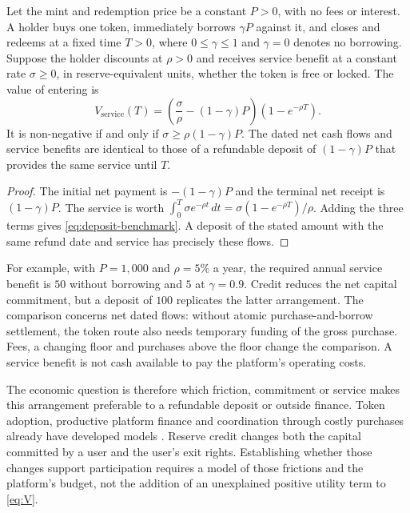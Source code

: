 \begin{samepage}
\begin{proposition}\label{prop:deposit-benchmark}
Let the mint and redemption price be a constant $P>0$, with no fees or interest. A holder buys one token, immediately borrows $\gamma P$ against it, and closes and redeems at a fixed time $T>0$, where $0\le\gamma\le1$ and $\gamma=0$ denotes no borrowing. Suppose the holder discounts at $\rho>0$ and receives service benefit at a constant rate $\sigma\ge0$, in reserve-equivalent units, whether the token is free or locked. The value of entering is
\begin{equation}\label{eq:deposit-benchmark}
V_{\mathrm{service}}(T)
=\left(\frac{\sigma}{\rho}-(1-\gamma)P\right)(1-e^{-\rho T}).
\end{equation}
It is non-negative if and only if $\sigma\ge\rho(1-\gamma)P$. The dated net cash flows and service benefits are identical to those of a refundable deposit of $(1-\gamma)P$ that provides the same service until $T$.
\end{proposition}
\end{samepage}
\begin{proof}
The initial net payment is $-(1-\gamma)P$ and the terminal net receipt is $(1-\gamma)P$. The service is worth $\int_0^T \sigma e^{-\rho t}\,dt=\sigma(1-e^{-\rho T})/\rho$. Adding the three terms gives \eqref{eq:deposit-benchmark}. A deposit of the stated amount with the same refund date and service has precisely these flows.
\end{proof}

For example, with $P=1{,}000$ and $\rho=5\%$ a year, the required annual service benefit is $50$ without borrowing and $5$ at $\gamma=0.9$. Credit reduces the net capital commitment, but a deposit of $100$ replicates the latter arrangement. The comparison concerns net dated flows: without atomic purchase-and-borrow settlement, the token route also needs temporary funding of the gross purchase. Fees, a changing floor and purchases above the floor change the comparison. A service benefit is not cash available to pay the platform's operating costs.

The economic question is therefore which friction, commitment or service makes this arrangement preferable to a refundable deposit or outside finance. Token adoption, productive platform finance and coordination through costly purchases already have developed models \citep{cong2021tokenomics,cong2022finance,limann2025}. Reserve credit changes both the capital committed by a user and the user's exit rights. Establishing whether those changes support participation requires a model of those frictions and the platform's budget, not the addition of an unexplained positive utility term to \eqref{eq:V}.

